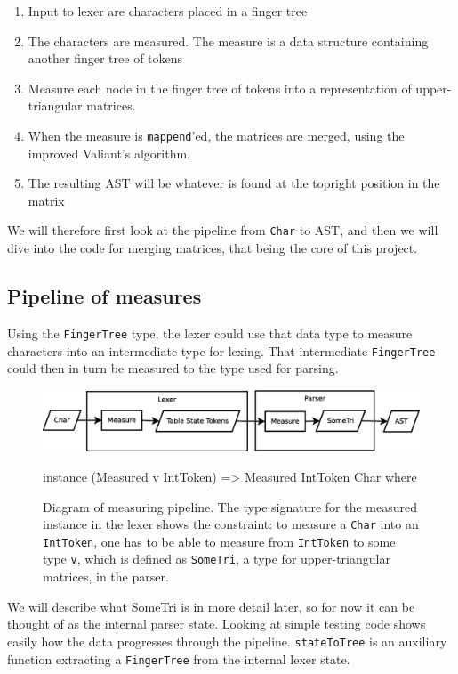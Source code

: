 \documentclass[a4paper,12pt,twosided]{report}
\begin{document}
\begin{enumerate}
    \item Input to lexer are characters placed in a finger tree
    \item The characters are measured. The measure is a data structure containing
          another finger tree of tokens
    \item Measure each node in the finger tree of tokens into a representation
          of upper-triangular matrices.
    \item When the measure is \texttt{mappend}'ed, the matrices are merged,
          using the improved Valiant's algorithm.
    \item The resulting AST will be whatever is found at the topright position
          in the matrix
\end{enumerate}
We will therefore first look at the pipeline from \texttt{Char} to AST, and then
we will dive into the code for merging matrices, that being the core of this
project. 

\subsection{Pipeline of measures}
\label{pipeline}
Using the \texttt{FingerTree} type, the lexer could use that data type to
measure characters into an intermediate type for lexing. That intermediate
\texttt{FingerTree} could then in turn be measured to the type used for parsing.

\begin{figure}[H]
\includegraphics[width=\textwidth]{pipeline.eps}
\begin{code}
instance (Measured v IntToken) => Measured IntToken Char where
\end{code}
\caption{\label{pipelinedia}Diagram of measuring pipeline. The type signature
for the measured instance in the lexer shows the constraint: to measure a
\texttt{Char} into an \texttt{IntToken}, one has to be able to measure from
\texttt{IntToken} to some type \texttt{v}, which is defined as \texttt{SomeTri},
a type for upper-triangular matrices, in the parser.}
\end{figure}

We will describe what SomeTri is in more detail later, so for now it can be
thought of as the internal parser state. Looking at simple testing
code shows easily how the data progresses through the pipeline.
\texttt{stateToTree} is an auxiliary function extracting a \texttt{FingerTree}
from the internal lexer state.
\end{document}
